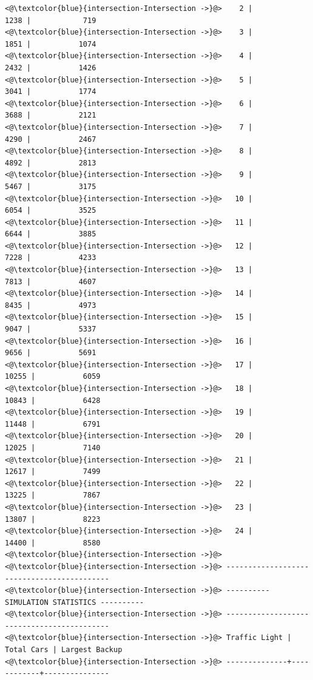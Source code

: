 \documentclass{article}
\begin{document}
\begin{lstlisting}[caption={Sample Simulation Output}, captionpos=b]
<@\textcolor{blue}{intersection-Intersection ->}@>    2 |             1238 |            719
<@\textcolor{blue}{intersection-Intersection ->}@>    3 |             1851 |           1074
<@\textcolor{blue}{intersection-Intersection ->}@>    4 |             2432 |           1426
<@\textcolor{blue}{intersection-Intersection ->}@>    5 |             3041 |           1774
<@\textcolor{blue}{intersection-Intersection ->}@>    6 |             3688 |           2121
<@\textcolor{blue}{intersection-Intersection ->}@>    7 |             4290 |           2467
<@\textcolor{blue}{intersection-Intersection ->}@>    8 |             4892 |           2813
<@\textcolor{blue}{intersection-Intersection ->}@>    9 |             5467 |           3175
<@\textcolor{blue}{intersection-Intersection ->}@>   10 |             6054 |           3525
<@\textcolor{blue}{intersection-Intersection ->}@>   11 |             6644 |           3885
<@\textcolor{blue}{intersection-Intersection ->}@>   12 |             7228 |           4233
<@\textcolor{blue}{intersection-Intersection ->}@>   13 |             7813 |           4607
<@\textcolor{blue}{intersection-Intersection ->}@>   14 |             8435 |           4973
<@\textcolor{blue}{intersection-Intersection ->}@>   15 |             9047 |           5337
<@\textcolor{blue}{intersection-Intersection ->}@>   16 |             9656 |           5691
<@\textcolor{blue}{intersection-Intersection ->}@>   17 |            10255 |           6059
<@\textcolor{blue}{intersection-Intersection ->}@>   18 |            10843 |           6428
<@\textcolor{blue}{intersection-Intersection ->}@>   19 |            11448 |           6791
<@\textcolor{blue}{intersection-Intersection ->}@>   20 |            12025 |           7140
<@\textcolor{blue}{intersection-Intersection ->}@>   21 |            12617 |           7499
<@\textcolor{blue}{intersection-Intersection ->}@>   22 |            13225 |           7867
<@\textcolor{blue}{intersection-Intersection ->}@>   23 |            13807 |           8223
<@\textcolor{blue}{intersection-Intersection ->}@>   24 |            14400 |           8580
<@\textcolor{blue}{intersection-Intersection ->}@> 
<@\textcolor{blue}{intersection-Intersection ->}@> -------------------------------------------
<@\textcolor{blue}{intersection-Intersection ->}@> ---------- SIMULATION STATISTICS ----------
<@\textcolor{blue}{intersection-Intersection ->}@> -------------------------------------------
<@\textcolor{blue}{intersection-Intersection ->}@> Traffic Light | Total Cars | Largest Backup
<@\textcolor{blue}{intersection-Intersection ->}@> --------------+------------+---------------

\end{lstlisting}
\end{document}

